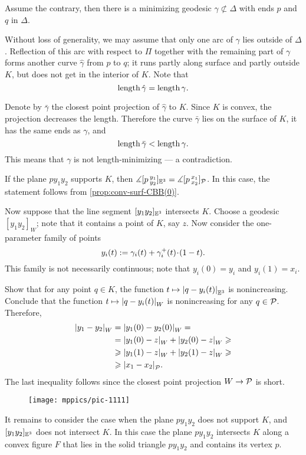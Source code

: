  Assume the contrary,
then there is a minimizing geodesic $\gamma\not\subset\Delta$ with ends $p$ and $q$ in $\Delta$.

Without loss of generality, we may assume that only one arc of $\gamma$ lies outside of $\Delta$.
Reflection of this arc  with respect to $\Pi$ together with the remaining part of $\gamma$ forms another curve $\hat\gamma$ from $p$ to $q$;
it runs partly along surface
and partly outside $K$,
but does not get in the interior of $K$.
Note that
\[\mathop{\rm length}\nolimits\hat\gamma=\mathop{\rm length}\nolimits\gamma.\]

Denote by $\bar\gamma$ the closest point projection of $\hat\gamma$ to $K$.
Since $K$ is convex, the projection decreases the length.
Therefore
the curve $\bar\gamma$ lies on the surface of $K$,
it has the same ends as $\gamma$,
and
\[\mathop{\rm length}\nolimits\bar\gamma<\mathop{\rm length}\nolimits\gamma.\]
This means that $\gamma$ is not length-minimizing
--- a contradiction.

If the plane $py_1y_2$ supports $K$, then 
$\measuredangle[p\,{}^{y_1}_{y_2}]_{\mathbb{E}^3}=\measuredangle[p\,{}^{x_1}_{x_2}]_{\mathcal{P}}$.
In this case, the statement follows from \ref{prop:conv-surf-CBB(0)}.

Now suppose that the line segment $[y_1y_2]_{\mathbb{E}^3}$ intersects $K$.
Choose a geodesic $[y_1y_2]_W$;
note that it contains a point of $K$, say $z$.
Now consider the one-parameter family of points 
\[y_i(t)\df \gamma_i(t)+\gamma_i^+(t)\z\cdot (1-t).\]
This family is not necessarily continuous; note that $y_i(0)=y_i$ and $y_i(1)=x_i$.

Show that for any point $q\in K$, the function $t\mapsto |{q}-{y_i(t)}|_{\mathbb{E}^3}^{{}}$ is nonincreasing.
Conclude that the function $t\mapsto |{q}-{y_i(t)}|_{W}^{{}}$ is nonincreasing for any $q\in \mathcal{P}$.
Therefore, 
\begin{align*}
|{y_1}-{y_2}|_{W}^{{}}
&=|{y_1(0)}-{y_2(0)}|_{W}^{{}}=
\\
&=|{y_1(0)}-{z}|_{W}^{{}}+|{y_2(0)}-{z}|_{W}^{{}}\geqslant
\\
&\geqslant|{y_1(1)}-{z}|_{W}^{{}}+|{y_2(1)}-{z}|_{W}^{{}}\geqslant
\\
&\geqslant|{x_1}-{x_2}|_{\mathcal{P}}^{{}}.
\end{align*}
The last inequality follows since the closest point projection $W\to \mathcal{P}$ is short.

\begin{wrapfigure}{o}{28mm}
\vskip-3mm
\centering
\texttt{[image: mppics/pic-1111]}
\vskip-0mm
\end{wrapfigure}

It remains to consider the case when the plane $py_1y_2$ does not support $K$,
and $[y_1y_2]_{\mathbb{E}^3}$ does not intersect $K$.
In this case the plane $py_1y_2$ intersects $K$ along a convex figure $F$ that lies in the solid triangle 
$py_1y_2$ and contains its vertex $p$.

